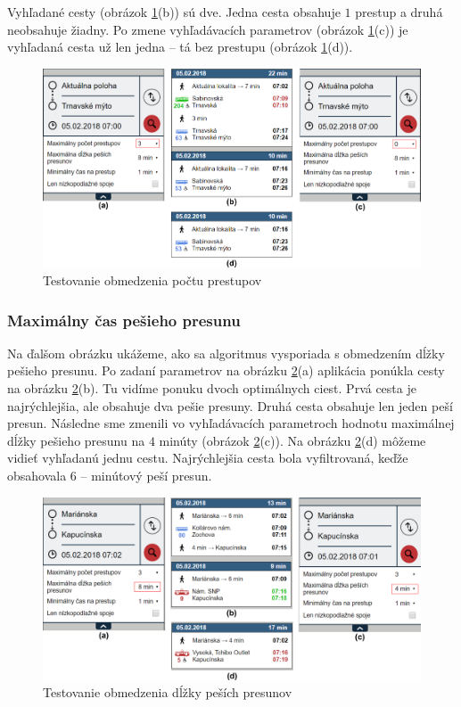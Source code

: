 Vyhľadané cesty (obrázok \ref{fig:test-max-transfers}(b)) sú dve. Jedna cesta obsahuje $1$ prestup a druhá neobsahuje žiadny. Po zmene vyhľadávacích parametrov (obrázok \ref{fig:test-max-transfers}(c)) je vyhľadaná cesta už len jedna – tá bez prestupu (obrázok \ref{fig:test-max-transfers}(d)).

\begin{figure}[H]
\centerline{\includegraphics[width=1.0\textwidth]{images/test/max-transfers-act}}
\caption[Testovanie obmedzenia počtu prestupov]{Testovanie obmedzenia počtu prestupov}
\label{fig:test-max-transfers}
\end{figure}

\subsubsection{Maximálny čas pešieho presunu}
Na ďalšom obrázku ukážeme, ako sa algoritmus vysporiada s obmedzením dĺžky pešieho presunu. Po zadaní parametrov na obrázku \ref{fig:test-max-walking}(a) aplikácia ponúkla cesty na obrázku \ref{fig:test-max-walking}(b). Tu vidíme ponuku dvoch optimálnych ciest. Prvá cesta je najrýchlejšia, ale obsahuje dva pešie presuny. Druhá cesta obsahuje len jeden peší presun. 
Následne sme zmenili vo vyhľadávacích parametroch hodnotu maximálnej dĺžky pešieho presunu na $4$ minúty (obrázok \ref{fig:test-max-walking}(c)). Na obrázku \ref{fig:test-max-walking}(d) môžeme vidieť vyhľadanú jednu cestu. Najrýchlejšia cesta bola vyfiltrovaná, keďže obsahovala $6$ – minútový peší presun. 

\begin{figure}[H]
\centerline{\includegraphics[width=1.0\textwidth]{images/test/max-walking}}
\caption[Testovanie obmedzenia dĺžky peších presunov]{Testovanie obmedzenia dĺžky peších presunov}
\label{fig:test-max-walking}
\end{figure}


